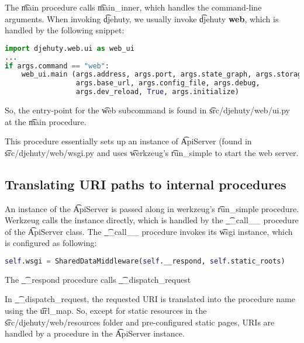 The \t{main} procedure calls \t{main\_inner}, which handles the command-line
arguments.  When invoking \t{djehuty}, we usually invoke
\t{djehuty \textbf{web}}, which is handled by the following snippet:
\begin{lstlisting}[language=python]
import djehuty.web.ui as web_ui
...
if args.command == "web":
    web_ui.main (args.address, args.port, args.state_graph, args.storage,
                 args.base_url, args.config_file, args.debug,
                 args.dev_reload, True, args.initialize)
\end{lstlisting}

So, the entry-point for the \t{web} subcommand is found in
\t{src/djehuty/web/ui.py} at the \t{main} procedure.

This procedure essentially sets up an instance of \t{ApiServer} (found in
\t{src/djehuty/web/wsgi.py} and uses \t{werkzeug}'s \t{run\_simple} to start
the web server.

\subsection{Translating URI paths to internal procedures}

An instance of the \t{ApiServer} is passed along in werkzeug's \t{run\_simple}
procedure.  Werkzeug calls the instance directly, which is handled by the
\t{\_\_call\_\_} procedure of the \t{ApiServer} class.  The \t{\_\_call\_\_} procedure
invokes its \t{wsgi} instance, which is configured as following:
\begin{lstlisting}[language=python]
self.wsgi = SharedDataMiddleware(self.__respond, self.static_roots)
\end{lstlisting}

The \t{\_\_respond} procedure calls \t{\_\_dispatch\_request}

In \t{\_\_dispatch\_request}, the requested URI is translated into the procedure
name using the \t{url\_map}.  So, except for static resources in the
\t{src/djehuty/web/resources} folder and pre-configured static pages, URIs are
handled by a procedure in the \t{ApiServer} instance.

